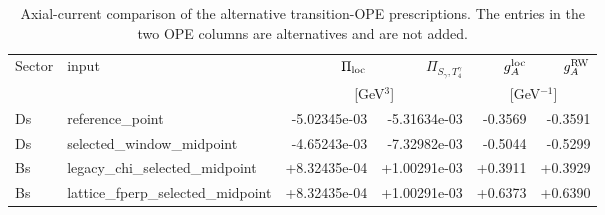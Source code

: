\begin{table}
\centering
\caption{Axial-current comparison of the alternative transition-OPE prescriptions. The entries in the two OPE columns are alternatives and are not added.}
\begin{tabular}{llrrrr}
\hline
Sector & input & $\Pi_{\rm loc}$ & $\Pi_{S_\gamma,T_4^\gamma}$ & $g_A^{\rm loc}$ & $g_A^{\rm RW}$ \\
 & & \multicolumn{2}{c}{[GeV$^3$]} & \multicolumn{2}{c}{[GeV$^{-1}$]} \\
\hline
Ds & reference\_point & -5.02345e-03 & -5.31634e-03 & -0.3569 & -0.3591 \\
Ds & selected\_window\_midpoint & -4.65243e-03 & -7.32982e-03 & -0.5044 & -0.5299 \\
Bs & legacy\_chi\_selected\_midpoint & +8.32435e-04 & +1.00291e-03 & +0.3911 & +0.3929 \\
Bs & lattice\_fperp\_selected\_midpoint & +8.32435e-04 & +1.00291e-03 & +0.6373 & +0.6390 \\
\hline
\end{tabular}
\label{tab:local-vs-rohrwild}
\end{table}
